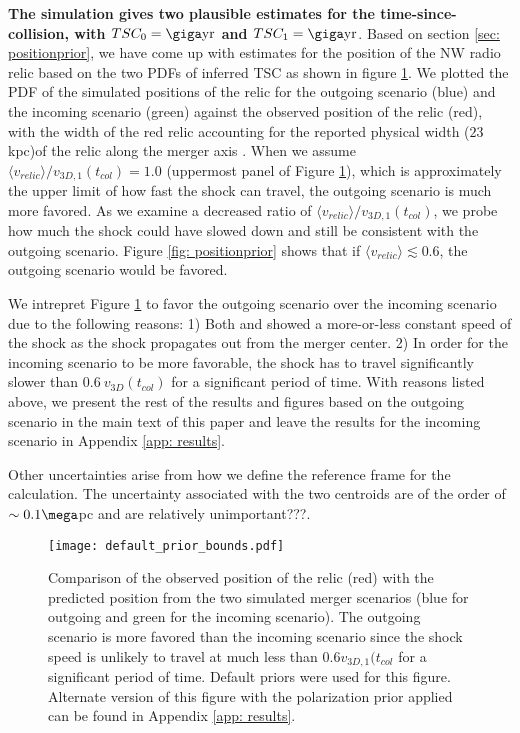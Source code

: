 \textbf{The simulation gives two plausible estimates for
the time-since-collision, with $TSC_0 = \giga \text{yr}$ and $TSC_1 = \giga
\text{yr}$}. Based on section \ref{sec: positionprior}, we have come up
with estimates for the position of the NW radio relic based on the two PDFs
of inferred TSC as shown in figure \ref{fig: positionprior}. We plotted
the PDF of the simulated positions of the relic for the outgoing scenario
(blue) and the incoming scenario (green) against
the observed position of the relic (red), with the width of the red
relic accounting for the reported physical width ($23$ kpc)of the relic along the
merger axis \citep{L13}. When we
assume $\langle v_{relic} \rangle / v_{3D,1}(t_{col}) = 1.0$ (uppermost
panel of Figure \ref{fig: positionprior}), which is approximately the upper
limit of how fast the shock can travel, the outgoing scenario is much more
favored. As we examine a decreased ratio of  $\langle v_{relic} \rangle /
v_{3D,1}(t_{col})$, we probe how much the shock could have slowed down
and still be consistent with the outgoing scenario. Figure \ref{fig:
positionprior} shows that if $\langle v_{relic} \rangle
\lesssim 0.6$, the outgoing scenario would be favored. \par 
	We intrepret Figure \ref{fig: positionprior} to favor
the outgoing scenario over the incoming scenario due to the following
reasons: 1) Both \citet{Springel2007} and \citet{Kang2007} showed a
more-or-less constant speed of the shock as the shock propagates out
from the merger center. 2) In order for the incoming scenario to be more
favorable, the shock has to travel significantly slower than $0.6~
v_{3D}(t_{col})$ for a significant period of time. With reasons listed
above, we present the rest of the results and figures based on the outgoing
scenario in the main text of this paper and leave the results for the
incoming scenario in Appendix \ref{app: results}. 

Other uncertainties arise from how we define the reference frame for the calculation. The
uncertainty associated with the two centroids are of the order
of $\sim 0.1 \mega$pc \citep{Jee13} and are relatively unimportant???.  

\begin{figure}
	\texttt{[image: default\_prior\_bounds.pdf]}
	\caption{Comparison of the observed position of the relic (red) with the
	predicted position from the two simulated merger scenarios (blue for
	outgoing and green for the incoming scenario). The outgoing scenario
	is more favored than the incoming scenario since the shock speed is
	unlikely to travel at much less than $0.6 v_{3D,1}(t_{col}$ for a
	significant period of time. Default priors were
	used for this figure. Alternate version of this figure with the polarization prior applied can
	be found in Appendix \ref{app: results}. \label{fig: positionprior}}
\end{figure}

